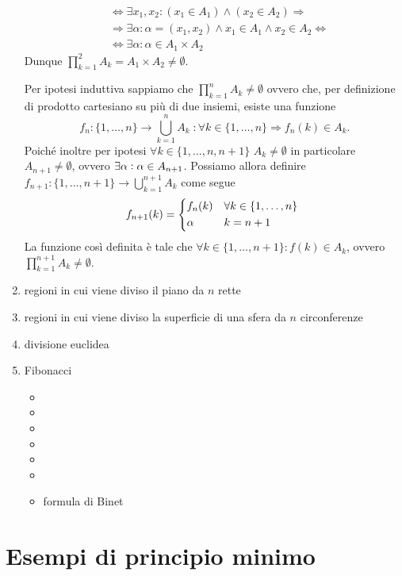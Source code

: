 \documentclass[a4paper]{article}\par \usepackage{style}\par
\begin{document}
\begin{enumerate}
\begin{pbase}
\begin{align*}
                                                                     & \iff \exists x_1, x_2 : (x_1 \in A_1) \wedge (x_2 \in A_2) \Rightarrow \\
                                                                     & \Rightarrow \exists \alpha : \alpha = (x_1, x_2) \wedge x_1 \in A_1 \wedge x_2 \in A_2 \iff \\
                                                                     & \iff \exists \alpha : \alpha \in A_1 \times A_2
    \end{align*}
    Dunque $ \prod_{k = 1}^{2} A_k = A_1 \times A_2 \neq \emptyset $.
  \end{pbase}
  \begin{pind}
    Per ipotesi induttiva sappiamo che $ \prod_{k = 1}^{n} A_k \neq \emptyset $ ovvero che, per definizione di prodotto cartesiano su più di due insiemi, esiste una funzione \[f_n \colon \{1, \dots, n\} \to \bigcup_{k = 1}^{n} A_k \; : \forall k \in \{1, \dots, n\} \Rightarrow f_n(k) \in A_k.\] Poiché inoltre per ipotesi $ \forall k \in \{1, \dots, n , n + 1\} $ $ A_k \neq \emptyset $ in particolare $ A_{n + 1} \neq \emptyset $, ovvero $ \exists \alpha : \alpha \in \nolinebreak A_{n + 1} $. Possiamo allora definire $ f_{n + 1} \colon \{1, \dots, n + 1\} \to \bigcup_{k = 1}^{n + 1} A_k $ come segue
    \[
      f_{n + 1}(k) =
      \begin{cases*}
        f_{n}(k) & $ \forall k \in \{1, \dots, n\} $ \\
        \alpha & $ k = n + 1 $
      \end{cases*}\]
    La funzione così definita è tale che $ \forall k \in \{1, \dots, n + 1\} : f(k) \in A_k $, ovvero $ \prod_{k = 1}^{n + 1} A_k \neq \emptyset $.
  \end{pind}
\item \textsf{regioni in cui viene diviso il piano da $ n $ rette}
\item \textsf{regioni in cui viene diviso la superficie di una sfera da $ n $ circonferenze}
\item \textsf{divisione euclidea}
\item \textsf{Fibonacci}
  \begin{itemize}
  \item
  \item
  \item
  \item
  \item
  \item
  \item \textsf{formula di Binet}
  \end{itemize}
\end{enumerate}\par \section{Esempi di principio minimo}
\end{document}
